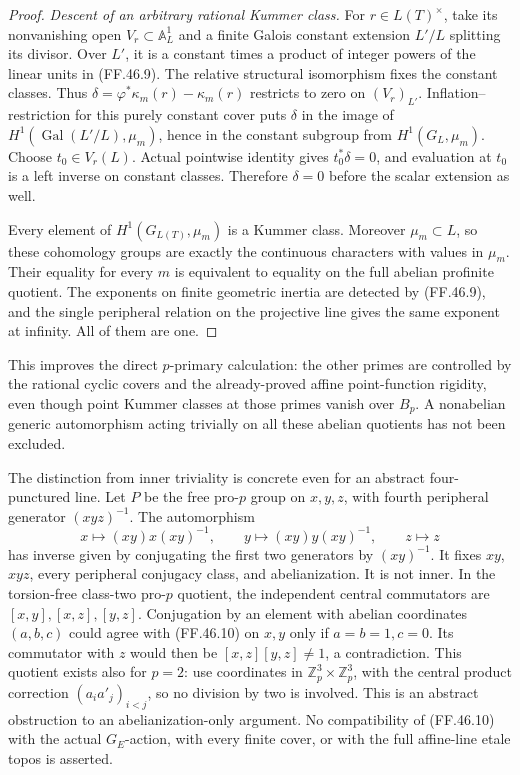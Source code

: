 \begin{proof}
\emph{Descent of an arbitrary rational Kummer class.}
For \(r\in L(T)^\times\), take its nonvanishing
open \(V_r\subset\mathbb A^1_L\) and a finite
Galois constant extension \(L'/L\) splitting its
divisor. Over \(L'\), it is a constant times a product
of integer powers of the linear units in (FF.46.9).
The relative structural isomorphism fixes the constant
classes. Thus
\(\delta=\varphi^*\kappa_m(r)-\kappa_m(r)\)
restricts to zero on \((V_r)_{L'}\).
Inflation--restriction for this purely constant cover
puts \(\delta\) in the image of
\(H^1(\operatorname{Gal}(L'/L),\mu_m)\), hence in
the constant subgroup from \(H^1(G_L,\mu_m)\).
Choose \(t_0\in V_r(L)\). Actual pointwise identity
gives \(t_0^*\delta=0\), and evaluation at \(t_0\)
is a left inverse on constant classes. Therefore
\(\delta=0\) before the scalar extension as well.

Every element of \(H^1(G_{L(T)},\mu_m)\) is a
Kummer class. Moreover \(\mu_m\subset L\), so
these cohomology groups are exactly the continuous
characters with values in \(\mu_m\). Their equality
for every \(m\) is equivalent to equality on the full
abelian profinite quotient. The exponents on finite
geometric inertia are detected by (FF.46.9), and the
single peripheral relation on the projective line gives
the same exponent at infinity. All of them are one.
\end{proof}

This improves the direct \(p\)-primary calculation:
the other primes are controlled by the rational cyclic
covers and the already-proved affine point-function
rigidity, even though point Kummer classes at those
primes vanish over \(B_p\). A nonabelian generic
automorphism acting trivially on all these abelian
quotients has not been excluded.


The distinction from inner triviality is concrete even
for an abstract four-punctured line. Let \(P\) be the
free pro-\(p\) group on \(x,y,z\), with fourth
peripheral generator \((xyz)^{-1}\). The automorphism
\[
 x\longmapsto(xy)x(xy)^{-1},\qquad
 y\longmapsto(xy)y(xy)^{-1},\qquad
 z\longmapsto z
                                                        \tag{FF.46.10}
\]
has inverse given by conjugating the first two generators
by \((xy)^{-1}\). It fixes \(xy\), \(xyz\), every
peripheral conjugacy class, and abelianization. It is not
inner. In the torsion-free class-two pro-\(p\) quotient,
the independent central commutators are
\([x,y],[x,z],[y,z]\). Conjugation by an element with
abelian coordinates \((a,b,c)\) could agree with
(FF.46.10) on \(x,y\) only if \(a=b=1,c=0\).
Its commutator with \(z\) would then be
\([x,z][y,z]\ne1\), a contradiction. This quotient
exists also for \(p=2\): use coordinates in
\(\mathbb Z_p^3\times\mathbb Z_p^3\), with the
central product correction
\((a_i a'_j)_{i<j}\), so no division by two is involved.
This is an abstract obstruction to an abelianization-only
argument. No compatibility of (FF.46.10) with the actual
\(G_E\)-action, with every finite cover, or with the
full affine-line etale topos is asserted.


